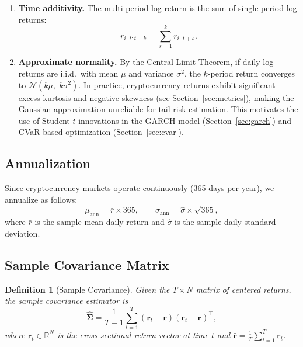 \documentclass[12pt,a4paper]{article}
\newtheorem{definition}{Definition}[section]
\newcommand{\R}{\mathbb{R}}
\begin{document}
\begin{enumerate}[nosep]
    \item \textbf{Time additivity.} The multi-period log return is the sum of single-period log returns:
    \begin{equation}
        r_{i,\,t:t+k} = \sum_{s=1}^{k} r_{i,\,t+s}.
    \end{equation}
    \item \textbf{Approximate normality.} By the Central Limit Theorem, if daily log returns are i.i.d.\ with mean $\mu$ and variance $\sigma^2$, the $k$-period return converges to $\mathcal{N}(k\mu,\; k\sigma^2)$. In practice, cryptocurrency returns exhibit significant excess kurtosis and negative skewness (see Section~\ref{sec:metrics}), making the Gaussian approximation unreliable for tail risk estimation. This motivates the use of Student-$t$ innovations in the GARCH model (Section~\ref{sec:garch}) and CVaR-based optimization (Section~\ref{sec:cvar}).
\end{enumerate}

\subsection{Annualization}

Since cryptocurrency markets operate continuously (365 days per year), we annualize as follows:
\begin{equation}
    \mu_{\text{ann}} = \bar{r} \times 365, \qquad
    \sigma_{\text{ann}} = \hat{\sigma} \times \sqrt{365},
    \label{eq:annualize}
\end{equation}
where $\bar{r}$ is the sample mean daily return and $\hat{\sigma}$ is the sample daily standard deviation.

\subsection{Sample Covariance Matrix}

\begin{definition}[Sample Covariance]
Given the $T \times N$ matrix of centered returns, the sample covariance estimator is
\begin{equation}
    \hat{\bm{\Sigma}} = \frac{1}{T-1} \sum_{t=1}^{T}
        (\bm{r}_t - \bar{\bm{r}})(\bm{r}_t - \bar{\bm{r}})^\top,
    \label{eq:sample-cov}
\end{equation}
where $\bm{r}_t \in \R^N$ is the cross-sectional return vector at time $t$ and $\bar{\bm{r}} = \frac{1}{T}\sum_{t=1}^T \bm{r}_t$.
\end{definition}
\end{document}

